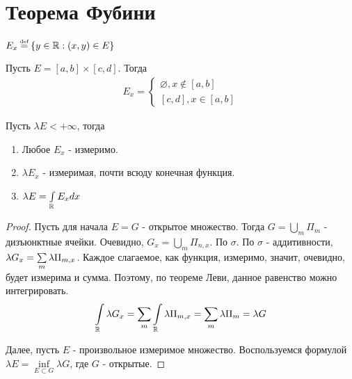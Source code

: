 \section{Теорема Фубини}

\begin{definition}
    $E_x \defeq \set{y \in \mathbb{R} : (x, y) \in E}$
\end{definition}

\begin{example}
    Пусть $E = [a, b] \times [c, d]$. Тогда 
    \begin{gather*}
        E_x = 
        \left\{ \begin{matrix}
                \varnothing, x \notin [a,b] 
                \\ 
                [c, d], x \in [a, b]
        \end{matrix}\right.
    \end{gather*}
\end{example}

\begin{theorem}
    Пусть $\lambda E < +\infty$, тогда
    \begin{enumerate}
        \item 
            Любое $E_x$ - измеримо.
        \item
            $\lambda E_x$ - измеримая, почти всюду конечная функция. 
        \item
            $\lambda E = \int\limits_{\mathbb{R}} E_x dx$
    \end{enumerate}
\end{theorem}

\begin{proof}
    Пусть для начала $E = G$ - открытое множество. Тогда $G = \bigcup\limits_{m} \Pi_m$ - дизъюнктные ячейки. 
    Очевидно, $G_x = \bigcup\limits_{m} \Pi_{n, x}$. По $\sigma$. По $\sigma$ - аддитивности, $\lambda G_x = \sum\limits_{m}\lambda \Pi_{m, x}$.
    Каждое слагаемое, как функция, измеримо, значит, очевидно, будет измерима и сумма. 
    Поэтому, по теореме Леви, данное равенство можно интегрировать. 
    \begin{gather*}
        \int\limits_{\mathbb{R}} \lambda G_x = \sum\limits_{m} \int\limits_{\mathbb{R}} \lambda \Pi_{m ,x} = \sum\limits_{m} \lambda \Pi_m = \lambda G
    \end{gather*}

    Далее, пусть $E$ - произвольное измеримое множество. Воспользуемся формулой $\lambda E = \inf\limits_{E \subset G} \lambda G$, где $G$ - открытые.
    \todo
\end{proof}

